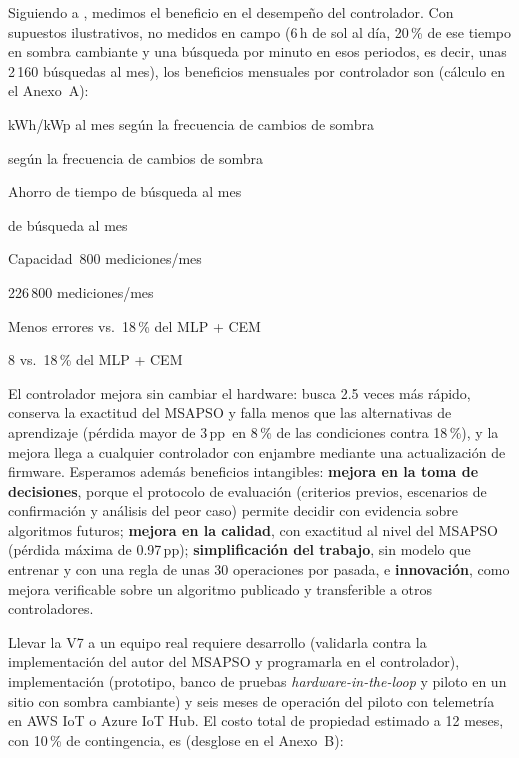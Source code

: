 \documentclass[letterpaper,11pt]{article}
\newcommand{\cifra}[5]{%
  \begingroup\setlength{\fboxsep}{5pt}%
  \colorbox{#1}{\parbox[t]{\dimexpr\linewidth-2\fboxsep\relax}{%
    \setstretch{1}\color{#2}{\Large\bfseries #3}\par
    #4%
    \ifx\relax#5\relax\else\par{\footnotesize #5}\fi}}%
  \endgroup}
\newcommand{\cifragris}[4]{\cifra{black!8}{black}{#1}{#2}{#3}}
\newcommand{\pp}{\,pp}
\begin{document}
Siguiendo a \textcite{korolov2022}, medimos el beneficio en el desempeño del controlador. Con supuestos ilustrativos, no medidos en campo (6\,h de sol al día, 20\,\% de ese tiempo en sombra cambiante y una búsqueda por minuto en esos periodos, es decir, unas 2\,160 búsquedas al mes), los beneficios mensuales por controlador son (cálculo en el Anexo~A):

\medskip
\noindent
\begin{minipage}[t]{0.235\linewidth}\cifragris{0.22--0.70}{kWh/kWp al mes}{según la frecuencia de cambios de sombra}{}\end{minipage}\hfill
\begin{minipage}[t]{0.235\linewidth}\cifragris{$-$18.9\,min}{Ahorro de tiempo}{de búsqueda al mes}{}\end{minipage}\hfill
\begin{minipage}[t]{0.235\linewidth}\cifragris{+150\,\%}{Capacidad}{226\,800 mediciones/mes}{}\end{minipage}\hfill
\begin{minipage}[t]{0.235\linewidth}\cifragris{$-$56\,\%}{Menos errores}{8 vs.\ 18\,\% del MLP + CEM}{}\end{minipage}

\medskip

El controlador mejora sin cambiar el hardware: busca 2.5 veces más rápido, conserva la exactitud del MSAPSO y falla menos que las alternativas de aprendizaje (pérdida mayor de 3\pp\ en 8\,\% de las condiciones contra 18\,\%), y la mejora llega a cualquier controlador con enjambre mediante una actualización de firmware. Esperamos además beneficios intangibles: \textbf{mejora en la toma de decisiones}, porque el protocolo de evaluación (criterios previos, escenarios de confirmación y análisis del peor caso) permite decidir con evidencia sobre algoritmos futuros; \textbf{mejora en la calidad}, con exactitud al nivel del MSAPSO (pérdida máxima de 0.97\pp); \textbf{simplificación del trabajo}, sin modelo que entrenar y con una regla de unas 30 operaciones por pasada, e \textbf{innovación}, como mejora verificable sobre un algoritmo publicado y transferible a otros controladores.

Llevar la V7 a un equipo real requiere desarrollo (validarla contra la implementación del autor del MSAPSO y programarla en el controlador), implementación (prototipo, banco de pruebas \textit{hardware-in-the-loop} y piloto en un sitio con sombra cambiante) y seis meses de operación del piloto con telemetría en AWS IoT o Azure IoT Hub. El costo total de propiedad estimado a 12 meses, con 10\,\% de contingencia, es (desglose en el Anexo~B):
\end{document}
